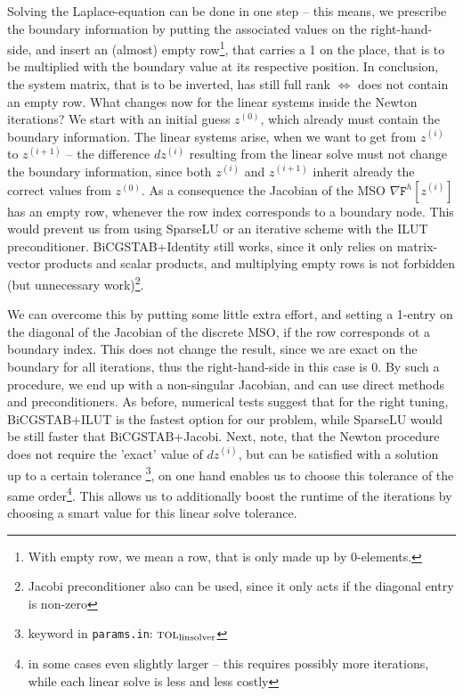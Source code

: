 \documentclass[11pt]{scrartcl}
\newcommand{\mSurfDisc}[1]{\ensuremath{\mathtt{F}^h\left[#1\right]}}
\begin{document}
Solving the Laplace-equation can be done in one step -- this means, we prescribe the boundary information by putting the associated values on the right-hand-side, and insert an (almost) empty row\footnote{With empty row, we mean a row, that is only made up by 0-elements.}, that carries a 1 on the place, that is to be multiplied with the boundary value at its respective position. In conclusion, the system matrix, that is to be inverted, has still full rank $\Leftrightarrow$ does not contain an empty row. What changes now for the linear systems inside the Newton iterations? We start with an initial guess $z^{(0)}$, which already must contain the boundary information. The linear systems arise, when we want to get from $z^{(i)}$ to $z^{(i+1)}$ -- the difference $dz^{(i)}$ resulting from the linear solve must not change the boundary information, since both  $z^{(i)}$ and $z^{(i+1)}$ inherit already the correct values from $z^{(0)}$. As a consequence the Jacobian of the MSO $\nabla\mSurfDisc{z^{(i)}}$ has an empty row, whenever the row index corresponds to a boundary node. This would prevent us from using SparseLU or an iterative scheme with the ILUT preconditioner. BiCGSTAB+Identity still works, since it only relies on matrix-vector products and scalar products, and multiplying empty rows is not forbidden (but unnecessary work)\footnote{Jacobi preconditioner also can be used, since it only acts if the diagonal entry is non-zero}.

We can overcome this by putting some little extra effort, and setting a 1-entry on the diagonal of the Jacobian of the discrete MSO, if the row corresponds ot a boundary index. This does not change the result, since we are exact on the boundary for all iterations, thus the right-hand-side in this case is 0. By such a procedure, we end up with a non-singular Jacobian, and can use direct methods and preconditioners. As before, numerical tests suggest that for the right tuning, BiCGSTAB+ILUT is the fastest option for our problem, while SparseLU would be still faster that BiCGSTAB+Jacobi. 
Next, note, that the Newton procedure does not require the 'exact' value of $dz^{(i)}$, but can be satisfied with a solution up to a certain tolerance \footnote{keyword in \texttt{params.in}: $\textsc{tol}_\text{linsolver}$}, on one hand enables us to choose this tolerance of the same order\footnote{in some cases even slightly larger -- this requires possibly more iterations, while each linear solve is less and less costly}. This allows us to additionally boost the runtime of the iterations by choosing a smart value for this linear solve tolerance. 
\end{document}
